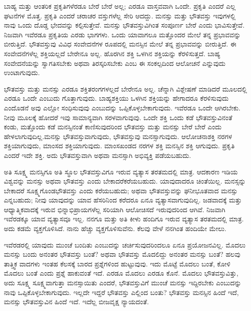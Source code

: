 ಬಾಹ್ಯ ಮತ್ತು ಆಂತರಿಕ ಪ್ರಕೃತಿಗಳೆರಡೂ ಬೇರೆ ಬೇರೆ ಅಲ್ಲ; ಎರಡೂ ವಾಸ್ತವವಾಗಿ ಒಂದೇ. ಪ್ರಕೃತಿ ಎಂದರೆ ಎಲ್ಲ ಘಟನೆಗಳ ಮೊತ್ತ. ಪ್ರಕೃತಿ ಎಂದರೆ ಚರಾಚರ ವಸ್ತುಗಳೆಲ್ಲ ಸೇರಿ ಆದದ್ದು. ಮನಸ್ಸು ಮತ್ತು ಭೌತವಸ್ತು ಇವುಗಳಲ್ಲಿ ನಾವು ಒಂದು ದೊಡ್ಡ ಭೇದವನ್ನು ಕಲ್ಪಿಸುತ್ತೇವೆ. ಮನಸ್ಸು ಭೌತವಸ್ತುವಿಗಿಂತ ಸಂಪೂರ್ಣ ಬೇರೆ ಎಂದು ಭಾವಿಸುತ್ತೇವೆ. ನಿಜವಾಗಿ ಇವೆರಡೂ ಪ್ರಕೃತಿಯ ಎರಡು ಭಾಗಗಳು. ಒಂದು ಯಾವಾಗಲೂ ಮತ್ತೊಂದರ ಮೇಲೆ ತನ್ನ ಪ್ರಭಾವವನ್ನು ಬೀರುತ್ತಿದೆ. ಭೌತವಸ್ತುವು ವಿವಿಧ ಸಂವೇದನೆಗಳ ರೂಪದಲ್ಲಿ ಮನಸ್ಸಿನ ಮೇಲೆ ತನ್ನ ಪ್ರಭಾವವನ್ನು ಬೀರುತ್ತಿದೆ. ಈ ಸಂವೇದನೆಗಳೆಲ್ಲ  ಶಕ್ತಿಯಲ್ಲದೆ ಬೇರೇನೂ ಅಲ್ಲ. ಹೊರಗಿನ ಶಕ್ತಿ ಒಳಗಿನ ಶಕ್ತಿಯನ್ನು ಕೆರಳಿಸುತ್ತದೆ. ಬಾಹ್ಯ ಸಂವೇದನೆಯನ್ನು ಸ್ವಾಗತಿಸಬೇಕು ಅಥವಾ ತಿರಸ್ಕರಿಸಬೇಕು ಎಂಬ ಈ ಸಂಕಲ್ಪದಿಂದ ಆಲೋಚನೆ ಎನ್ನುವುದು ಉಂಟಾಗುವುದು.

ಭೌತವಸ್ತು ಮತ್ತು ಮನಸ್ಸು ಎರಡೂ ಶಕ್ತಿತರಂಗಗಳಲ್ಲದೆ ಬೇರೇನೂ ಅಲ್ಲ. ಚೆನ್ನಾಗಿ ವಿಶ್ಲೇಷಣೆ ಮಾಡಿದರೆ ಮೂಲದಲ್ಲಿ ಎರಡೂ ಒಂದೇ ಎಂಬುದು ಗೊತ್ತಾಗುವುದು. ಬಾಹ್ಯಶಕ್ತಿಯು ಒಳಗಿನ ಶಕ್ತಿಯನ್ನು ಹೇಗಾದರೂ ಕೆರಳಿಸುವುದು ಎಂದೊಡನೆ ಅವು ಎಲ್ಲೋ ಸಂಧಿಸುವುವು ಎಂಬುದನ್ನು ಒಪ್ಪಿಕೊಳ್ಳಬೇಕಾಗುವುದು. ಇವೆರಡೂ ಒಂದೇ ಆಗಿರಬೇಕು. ನೀವು ಮೂಲಕ್ಕೆ ಹೋದರೆ ಇವು ಸಾಮಾನ್ಯವಾಗಿ ಸರಳವಾಗುವುವು. ಒಂದೇ ಶಕ್ತಿ ಒಂದು ಕಡೆ ಭೌತವಸ್ತುವಿನಂತೆ ಕಂಡು, ಮತ್ತೊಂದು ಕಡೆ ಮನಸ್ಸಿನಂತೆ ಕಾಣಿಸುವುದರಿಂದ ಭೌತವಸ್ತು ಮತ್ತು ಮನಸ್ಸು ಬೇರೆ ಬೇರೆ ಎಂದು ಹೇಳಲಾಗುವುದಿಲ್ಲ.\break ಮನಸ್ಸು ಭೌತವಸ್ತುವಾಗುವುದು, ಭೌತವಸ್ತುವು ಮನಸ್ಸಾಗುವುದು. ಆಲೋಚನಾಶಕ್ತಿ ನರಗಳ ಶಕ್ತಿಯಾಗುವುದು, ಮಾಂಸದ ಶಕ್ತಿಯಾಗುವುದು. ಮಾಂಸಖಂಡದ ನರಗಳ ಶಕ್ತಿ ಮನಸ್ಸಿನ ಶಕ್ತಿ ಆಗುವುದು. ಪ್ರಕೃತಿ ಎಂದರೆ ಇದೇ ಶಕ್ತಿ. ಅದು ಭೌತವಸ್ತುವಾಗಿ ಅಥವಾ ಮನಸ್ಸಾಗಿ ಅಭಿವ್ಯಕ್ತಿ ಪಡೆಯಬಹುದು.

ಅತಿ ಸೂಕ್ಷ್ಮ ಮನಸ್ಸಿಗೂ ಅತಿ ಸ್ಥೂಲ ಭೌತವಸ್ತುವಿಗೂ ಇರುವ ವ್ಯತ್ಯಾಸ ತರತಮದಲ್ಲಿ ಮಾತ್ರ. ಆದಕಾರಣ ಇಡಿಯ ವಿಶ್ವವನ್ನು ಮನಸ್ಸು ಅಥವಾ ಭೌತವಸ್ತು ಎಂದು ಬೇಕಾದರೆ\break ಕರೆಯಬಹುದು. ಯಾವುದಾದರೂ ಚಿಂತೆಯಿಲ್ಲ. ಮನಸ್ಸನ್ನು ಬೇಕಾದರೆ ಸೂಕ್ಷ್ಮಗೊಂಡ\break ಭೌತವಸ್ತು ಎಂದು ಕರೆಯಬಹುದು; ಅಥವಾ ಭೌತವಸ್ತುವನ್ನು ಘನೀಭೂತವಾದ ಮನಸ್ಸು ಎನ್ನಬಹುದು; ನೀವು ಯಾವುದನ್ನು ಯಾವ ಹೆಸರಿನಿಂದ ಕರೆದರೂ ಏನೂ ವ್ಯತ್ಯಾಸವಾಗು\-ವುದಿಲ್ಲ. ಜಡವಾದಕ್ಕೆ ಮತ್ತು ಆಧ್ಯಾತ್ಮಿಕವಾದಕ್ಕೆ ಇರುವ ಭಿನ್ನಾಭಿಪ್ರಾಯಗಳೆಲ್ಲ ಸರಿಯಾಗಿ ಆಲೋಚಿಸದೆ ಇರುವುದರಿಂದ ಆಗಿವೆ. ನಿಜವಾಗಿ ಇವೆರಡಕ್ಕೂ ಯಾವ ವ್ಯತ್ಯಾಸವೂ ಇಲ್ಲ. ನನಗೂ ಮತ್ತು ಅತಿ ಕೀಳು ಹಂದಿಗೂ ಇರುವ ವ್ಯತ್ಯಾಸ ತರತಮದಲ್ಲಿ ಮಾತ್ರ. ಅದು ಕಡಮೆ ವ್ಯಕ್ತಗೊಳಿಸಿದೆ. ನಾನು ಹೆಚ್ಚು ವ್ಯಕ್ತಗೊಳಿಸುವೆನು. ಕೆಲವು ವೇಳೆ ನನಗಿಂತ ಹಂದಿಯೇ ಮೇಲು.

ಇವೆರಡರಲ್ಲಿ ಯಾವುದು ಮುಂಚೆ ಬಂದಿತು ಎಂಬುದನ್ನು ಚರ್ಚಿಸುವುದರಿಂದಲೂ ಏನೂ ಪ್ರಯೋಜನವಿಲ್ಲ. ಮೊದಲು ಮನಸ್ಸು ಬಂದು ಅನಂತರ ಭೌತವಸ್ತು ಬಂತೆ? ಅಥವಾ ಭೌತವಸ್ತು ಮೊದಲಿದ್ದು ಅನಂತರ ಮನಸ್ಸು ಬಂತೆ? ಹಲವು ತಾತ್ತ್ವಿಕ ವಾದಗಳು ಇಂತಹ ಕೆಲಸಕ್ಕೆ ಬಾರದ ಪ್ರಶ್ನೆಗಳಿಂದ ಹುಟ್ಟುವುವು. ಇದು ಮೊಟ್ಟೆ ಮೊದಲು ಬಂತೆ, ಕೋಳಿ ಮೊದಲು ಬಂತೆ ಎಂದು ಪ್ರಶ್ನೆ ಹಾಕುವಂತೆ ಇದೆ. ಎರಡೂ ಮೊದಲು ಎರಡೂ ಕೊನೆ. ಮೊದಲು ಭೌತವಸ್ತುವಿತ್ತು, ಅದು ಸೂಕ್ಷ್ಮ ಸೂಕ್ಷ್ಮವಾಗುತ್ತಾ ಮನಸ್ಸಾಯಿತು ಎಂದರೆ, ಭೌತವಸ್ತುವಿಗೆ ಮುಂಚೆ ಮನಸ್ಸು ಇದ್ದಿರಬೇಕು ಎಂಬುದನ್ನು ನಾವು ಒಪ್ಪಿಕೊಳ್ಳಬೇಕಾಗುವುದು. ಇಲ್ಲದೇ ಇದ್ದರೆ ಭೌತವಸ್ತು ಎಲ್ಲಿಂದ ಬಂತು? ಭೌತವಸ್ತು ಮನಸ್ಸಿನ ಹಿಂದೆ ಇದೆ, ಮನಸ್ಸು ಭೌತವಸ್ತುವಿನ ಹಿಂದೆ ಇದೆ. ಇದೆಲ್ಲ ಬೀಜವೃಕ್ಷ ನ್ಯಾಯದಂತೆ.

